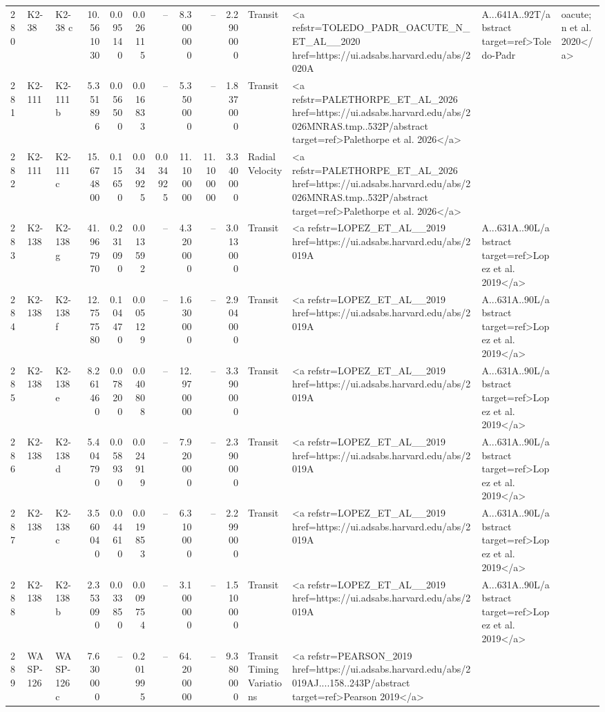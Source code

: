 \begin{tabular}{lllrrrrrrrll}
280 & K2-38 & K2-38 c & 10.561030 & 0.095140 & 0.026115 & -- & 8.300000 & -- & 2.290000 & Transit & <a refstr=TOLEDO_PADR_OACUTE_N_ET_AL__2020 href=https://ui.adsabs.harvard.edu/abs/2020A&A...641A..92T/abstract target=ref>Toledo-Padr&oacute;n et al. 2020</a> \\
281 & K2-111 & K2-111 b & 5.351896 & 0.056500 & 0.016833 & -- & 5.350000 & -- & 1.837000 & Transit & <a refstr=PALETHORPE_ET_AL_2026 href=https://ui.adsabs.harvard.edu/abs/2026MNRAS.tmp..532P/abstract target=ref>Palethorpe et al. 2026</a> \\
282 & K2-111 & K2-111 c & 15.674800 & 0.115650 & 0.034925 & 0.034925 & 11.100000 & 11.100000 & 3.340000 & Radial Velocity & <a refstr=PALETHORPE_ET_AL_2026 href=https://ui.adsabs.harvard.edu/abs/2026MNRAS.tmp..532P/abstract target=ref>Palethorpe et al. 2026</a> \\
283 & K2-138 & K2-138 g & 41.967970 & 0.231090 & 0.013592 & -- & 4.320000 & -- & 3.013000 & Transit & <a refstr=LOPEZ_ET_AL__2019 href=https://ui.adsabs.harvard.edu/abs/2019A&A...631A..90L/abstract target=ref>Lopez et al. 2019</a> \\
284 & K2-138 & K2-138 f & 12.757580 & 0.104470 & 0.005129 & -- & 1.630000 & -- & 2.904000 & Transit & <a refstr=LOPEZ_ET_AL__2019 href=https://ui.adsabs.harvard.edu/abs/2019A&A...631A..90L/abstract target=ref>Lopez et al. 2019</a> \\
285 & K2-138 & K2-138 e & 8.261460 & 0.078200 & 0.040808 & -- & 12.970000 & -- & 3.390000 & Transit & <a refstr=LOPEZ_ET_AL__2019 href=https://ui.adsabs.harvard.edu/abs/2019A&A...631A..90L/abstract target=ref>Lopez et al. 2019</a> \\
286 & K2-138 & K2-138 d & 5.404790 & 0.058930 & 0.024919 & -- & 7.920000 & -- & 2.390000 & Transit & <a refstr=LOPEZ_ET_AL__2019 href=https://ui.adsabs.harvard.edu/abs/2019A&A...631A..90L/abstract target=ref>Lopez et al. 2019</a> \\
287 & K2-138 & K2-138 c & 3.560040 & 0.044610 & 0.019853 & -- & 6.310000 & -- & 2.299000 & Transit & <a refstr=LOPEZ_ET_AL__2019 href=https://ui.adsabs.harvard.edu/abs/2019A&A...631A..90L/abstract target=ref>Lopez et al. 2019</a> \\
288 & K2-138 & K2-138 b & 2.353090 & 0.033850 & 0.009754 & -- & 3.100000 & -- & 1.510000 & Transit & <a refstr=LOPEZ_ET_AL__2019 href=https://ui.adsabs.harvard.edu/abs/2019A&A...631A..90L/abstract target=ref>Lopez et al. 2019</a> \\
289 & WASP-126 & WASP-126 c & 7.630000 & -- & 0.201995 & -- & 64.200000 & -- & 9.380000 & Transit Timing Variations & <a refstr=PEARSON_2019 href=https://ui.adsabs.harvard.edu/abs/2019AJ....158..243P/abstract target=ref>Pearson 2019</a> \\

\end{tabular}

